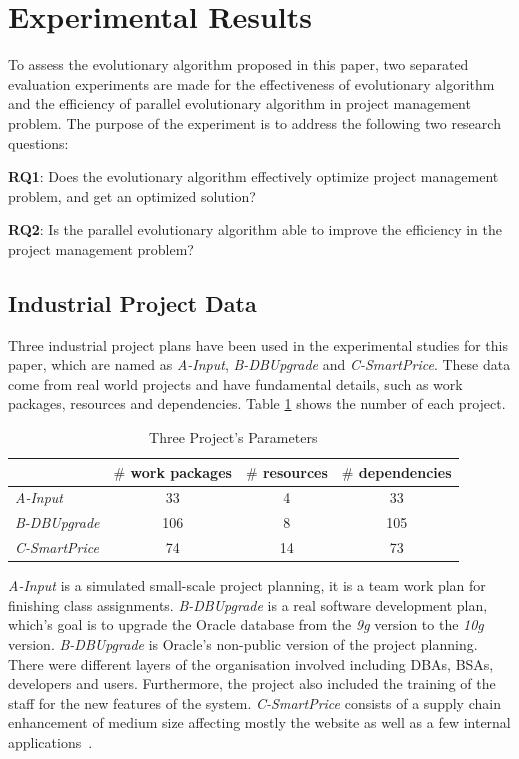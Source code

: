 %
%
\newcommand{\projectA}[0]{\emph{A-Input}}
\newcommand{\projectB}[0]{\emph{B-DBUpgrade}}
\newcommand{\projectC}[0]{\emph{C-SmartPrice}}

\section{Experimental Results}
%
To assess the evolutionary algorithm proposed in this paper, two separated
evaluation experiments are made for the effectiveness of evolutionary algorithm
and the efficiency of parallel evolutionary algorithm in project management
problem. The purpose of the experiment is to address the following two
research questions:

\textbf{RQ1}: Does the evolutionary algorithm effectively optimize project
management problem, and get an optimized solution?

\textbf{RQ2}: Is the parallel evolutionary algorithm able to improve the
efficiency in the project management problem?


\subsection{Industrial Project Data}
%
Three industrial project plans have been used in the experimental studies for
this paper, which are named as \projectA{}, \projectB{} and \projectC{}. These
data come from real world projects and have fundamental details, such as work
packages, resources and dependencies. Table \ref{tab:statis} shows the number of
each project.

% 
\begin{table}[!h]
  \centering
  \caption{Three Project's Parameters}
  \label{tab:statis}
  \begin{tabular}{lccc}
    \hline
      & $\#$ work packages & $\#$ resources & $\#$ dependencies \\
    \hline
    \projectA{} & 33  & 4  & 33  \\
    \projectB{} & 106 & 8  & 105 \\
    \projectC{} & 74  & 14 & 73  \\
    \hline
  \end{tabular}
\end{table}

\projectA{} is a simulated small-scale project planning, it is a team work plan
for finishing class assignments. \projectB{} is a real software development
plan, which's goal is to upgrade the Oracle database from the \emph{9g} version
to the \emph{10g} version. \projectB{} is Oracle's non-public version of the
project planning. There were different layers of the organisation involved
including DBAs, BSAs, developers and users.  Furthermore, the project also
included the training of the staff for the new features of the
system. \projectC{} consists of a supply chain enhancement of medium size
affecting mostly the website as well as a few internal applications~\cite{ren2}.

